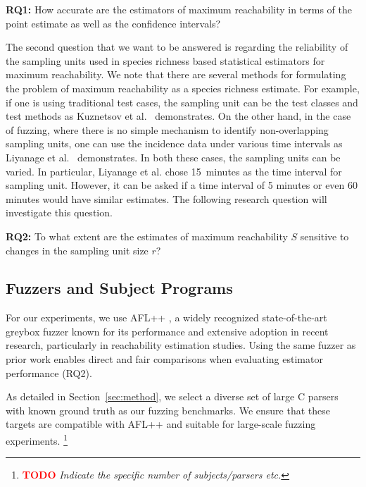 \documentclass[conference,anonymous,review]{IEEEtran}
\newcounter{todocounter}
\newcommand{\todo}[1]{\marginpar{$|$}\textcolor{red}{\stepcounter{todocounter}\footnote[\thetodocounter]{\textcolor{red}{\textbf{TODO }}\textit{#1}}}}
\begin{document}
\noindent\textbf{RQ1:} How accurate are the estimators of maximum reachability
in terms of the point estimate as well as the confidence intervals?

The second question that we want to be answered is regarding the reliability
of the sampling units used in species richness based statistical estimators for
maximum reachability. We note that there are several methods for formulating
the problem of maximum reachability as a species richness estimate. For example,
if one is using traditional test cases, the sampling unit can be the test
classes and test methods as Kuznetsov et al.~\cite{Kuznetsov2024empirical}
demonstrates. On the other hand, in the case of fuzzing, where there is no
simple mechanism to identify non-overlapping sampling units, one can use the
incidence data under various time intervals as
Liyanage et al.~\cite{liyanage2023reachable} demonstrates. In both these cases, the
sampling units can be varied. In particular, Liyanage et al. chose 15~minutes
as the time interval for sampling unit. However, it can be asked if a time
interval of 5 minutes or even 60 minutes would have similar estimates.
The following research question will investigate this question.

\noindent\textbf{RQ2:} To what extent are the estimates of maximum reachability
$S$ sensitive to changes in the sampling unit size $r$?

\subsection{Fuzzers and Subject Programs}

For our experiments, we use AFL++ \cite{fioraldi2020AFL++}, a widely recognized state-of-the-art greybox fuzzer known for its performance and extensive adoption in recent research, particularly in reachability estimation studies. Using the same fuzzer as prior work enables direct and fair comparisons when evaluating estimator performance (RQ2).

As detailed in Section~\ref{sec:method}, we select a diverse set of large C parsers with known ground truth as our fuzzing benchmarks. We ensure that these targets are compatible with AFL++ and suitable for large-scale fuzzing experiments. \todo{Indicate the specific number of subjects/parsers etc.}
\end{document}

